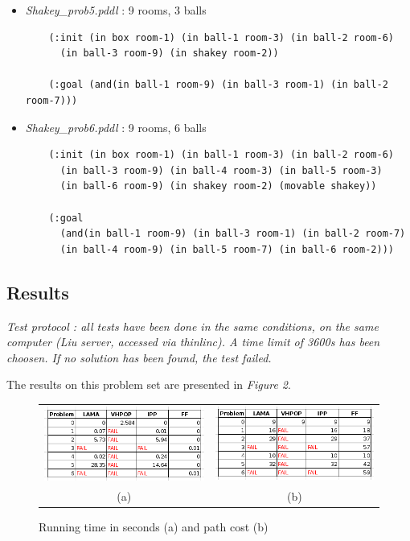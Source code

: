 \begin{itemize}
\begin{verbatim}
    (:goal (in ball-1 room-9))
  \end{verbatim}
  \item \textit{Shakey\_prob5.pddl} : 9 rooms, 3 balls
  \vspace*{1em}
  \begin{verbatim}
    (:init (in box room-1) (in ball-1 room-3) (in ball-2 room-6)
      (in ball-3 room-9) (in shakey room-2))

    (:goal (and(in ball-1 room-9) (in ball-3 room-1) (in ball-2 room-7)))
  \end{verbatim}
  \item \textit{Shakey\_prob6.pddl} : 9 rooms, 6 balls
  \vspace*{1em}
  \begin{verbatim}
    (:init (in box room-1) (in ball-1 room-3) (in ball-2 room-6)
      (in ball-3 room-9) (in ball-4 room-3) (in ball-5 room-3)
      (in ball-6 room-9) (in shakey room-2) (movable shakey))

    (:goal
      (and(in ball-1 room-9) (in ball-3 room-1) (in ball-2 room-7)
      (in ball-4 room-9) (in ball-5 room-7) (in ball-6 room-2)))
  \end{verbatim}
\end{itemize}
\newpage
\subsection*{Results}
\thispagestyle{empty}
\textit{Test protocol : all tests have been done in the same conditions, on
the same computer (Liu server, accessed via thinlinc). A time limit of 3600s
has been choosen. If no solution has been found, the test failed.}
\thispagestyle{empty}

The results on this problem set are presented in \textit{Figure 2}.

\begin{figure}[h]
    \centering
    \begin{tabular}{cc}
      \includegraphics[width=.49\linewidth,scale=1]{./images/tab1.png} &
\includegraphics[width=.49\linewidth, scale=1.5]{./images/tab2.png} \\
      (a) & (b)
    \end{tabular}
    \caption{Running time in seconds (a) and path cost (b)}
\end{figure}

